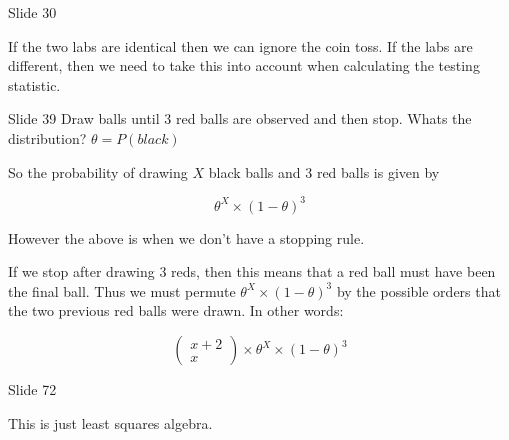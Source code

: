 \documentclass{article}
\begin{document}




\begin{problem}{Slide 30}
\end{problem}

If the two labs are identical then we can ignore the coin toss. 
If the labs are different, then we need to take this into account when calculating the testing statistic.

\begin{problem}{Slide 39}
Draw balls until 3 red balls are observed and then stop.
Whats the distribution? $\theta =P(black)$
\end{problem}

So the probability of drawing $X$ black balls and $3$ red balls is given by

$$
\theta ^ X \times (1-\theta)^3
$$

However the above is when we don't have a stopping rule. 

If we stop after drawing 3 reds, then this means that a red ball must have been the final ball. Thus we must permute $\theta ^ X \times (1-\theta)^3$ by the possible orders that the two previous red balls were drawn. In other words:

$$
\left(\begin{array}{c}x+2 \\ x\end{array}\right)\times \theta ^ X \times (1-\theta)^3
$$
\begin{problem}{Slide 72}
\end{problem}

This is just least squares algebra.
\newpage
\end{document}
